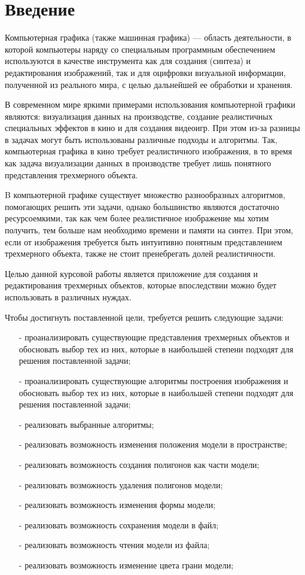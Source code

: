 \chapter*{Введение}

Компьютерная графика (также машинная графика) — область деятельности, в которой компьютеры наряду со специальным программным обеспечением используются в качестве инструмента как для создания (синтеза) и редактирования изображений, так и для оцифровки визуальной информации, полученной из реального мира, с целью дальнейшей ее обработки и хранения.

В современном мире яркими примерами использования компьютерной графики являются: визуализация данных на производстве, создание реалистичных специальных эффектов в кино и для создания видеоигр.
При этом из-за разницы в задачах могут быть использованы различные подходы и алгоритмы. Так, компьютерная графика в кино требует реалистичного изображения, в то время как задача визуализации данных в производстве требует лишь понятного представления трехмерного объекта.

B компьютерной графике существует множество разнообразных алгоритмов, помогающих решить эти задачи, однако большинство являются достаточно ресурсоемкими, так как чем более реалистичное изображение мы хотим получить, тем больше нам необходимо времени и памяти на синтез. При этом, если от изображения требуется быть интуитивно понятным представлением трехмерного объекта, также не стоит пренебрегать долей реалистичности.

Целью данной курсовой работы является приложение для создания и редактирования трехмерных объектов, которые впоследствии можно будет использовать в различных нуждах.

Чтобы достигнуть поставленной цели, требуется решить следующие задачи:
\begin{itemize}
	\item[-] проанализировать существующие представления трехмерных объектов и обосновать выбор тех из них, которые в наибольшей степени подходят для решения поставленной задачи;
	\item[-] проанализировать существующие алгоритмы построения изображения и обосновать выбор тех из них, которые в наибольшей степени подходят для решения поставленной задачи;
	\item[-] реализовать выбранные алгоритмы;
	\item[-] реализовать возможность изменения положения модели в пространстве;
	\item[-] реализовать возможность создания полигонов как части модели;
	\item[-] реализовать возможность удаления полигонов модели;
	\item[-] реализовать возможность изменения формы модели;
	\item[-] реализовать возможность сохранения модели в файл;
	\item[-] реализовать возможность чтения модели из файла;
	\item[-] реализовать возможность изменение цвета грани модели;
\end{itemize}